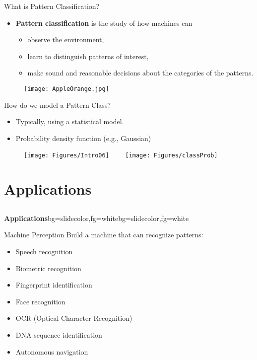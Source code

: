\begin{frame}{What is Pattern Classification?}
\begin{itemize}
\item \textbf{\color{mycolor2}Pattern classification} is the study of how machines can
\begin{itemize}
\item observe the environment,
\item learn to distinguish patterns of interest,
\item make sound and reasonable decisions about the categories of the patterns.
\end{itemize} 
\end{itemize}
\begin{figure}
\centering
\texttt{[image: AppleOrange.jpg]}
\end{figure}
\end{frame}

\begin{frame}{How do we model a Pattern Class?}
\begin{itemize}
\item Typically, using a statistical model.
\item Probability density function (e.g., Gaussian)
\end{itemize}
\begin{figure}
\texttt{[image: Figures/Intro06]}~~~~
\texttt{[image: Figures/classProb]}
\end{figure}
\end{frame}

\section{Applications}
\subsection{}

\begin{frame}{}
\begin{variableblock}{\centering \Large \textbf{\vspace{4pt}\newline Applications\vspace{4pt}}}{bg=slidecolor,fg=white}{bg=slidecolor,fg=white}
\end{variableblock}
\end{frame}

\begin{frame}{Machine Perception}
Build a machine that can recognize patterns:
\begin{itemize}
\item Speech recognition
\item Biometric recognition
\item Fingerprint identification
\item Face recognition
\item OCR (Optical Character Recognition)
\item DNA sequence identification
\item Autonomous navigation
\end{itemize}
\end{frame}

